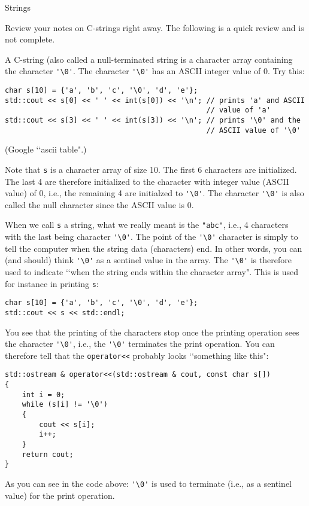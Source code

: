 Strings

Review your notes on C-strings right away. The following is a quick review and
is not complete.

A C-string (also called a null-terminated string is a character array
containing the character \verb!'\0'!. The 
character \verb!'\0'! has an ASCII integer value of 0. Try this:

{\small
\begin{Verbatim}[frame=single, commandchars = \~\@\!]
char s[10] = {'a', 'b', 'c', '\0', 'd', 'e'};
std::cout << s[0] << ' ' << int(s[0]) << '\n'; // prints 'a' and ASCII
                                               // value of 'a'
std::cout << s[3] << ' ' << int(s[3]) << '\n'; // prints '\0' and the
                                               // ASCII value of '\0'
\end{Verbatim}
}
(Google \lq\lq ascii table".)

Note that \verb!s! is a character array of size 10.
The first 6 characters are initialized. The last 4 are therefore
initialized to the character with integer value (ASCII value) of 0, i.e.,
the remaining 4 are initialzed to
\verb!'\0'!. The character \verb!'\0'! is also called the null character
since the ASCII value is 0.

When we call \verb!s! a string, what we really meant is the \verb!"abc"!,
i.e., 4 characters with the last being character \verb!'\0'!.
The point of the \verb!'\0'! character is simply to
tell the computer when the string data (characters) end.
In other words, you can (and should) think \verb!'\0'! as
a sentinel value in the array.
The \verb!'\0'! is therefore used to indicate
\lq\lq when the string ends within the character array".
This is used for instance in printing \verb!s!:
{\small
\begin{Verbatim}[frame=single, commandchars = \~\@\!]
char s[10] = {'a', 'b', 'c', '\0', 'd', 'e'};
std::cout << s << std::endl;
\end{Verbatim}
}
You see that the printing of the characters stop once the
printing operation sees the character \verb!'\0'!, i.e.,
the \verb!'\0'! terminates the print operation. You can therefore tell
that the \verb!operator<<! probably looks
\lq\lq something like this":
{\small
\begin{Verbatim}[frame=single, commandchars = \~\@\$]
std::ostream & operator<<(std::ostream & cout, const char s[])
{
    int i = 0;
    while (s[i] != '\0')
    {
        cout << s[i];
        i++;
    }
    return cout;
}
\end{Verbatim}
}
As you can see in the code above: \verb!'\0'! is used to terminate
(i.e., as a sentinel value) for the print operation.

